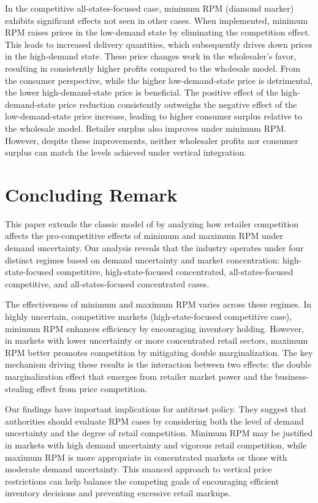 \documentclass[12pt]{article}
\begin{document}
In the competitive all-states-focused case, minimum RPM (diamond marker) exhibits significant effects not seen in other cases. When implemented, minimum RPM raises prices in the low-demand state by eliminating the competition effect. This leads to increased delivery quantities, which subsequently drives down prices in the high-demand state. These price changes work in the wholesaler's favor, resulting in consistently higher profits compared to the wholesale model. From the consumer perspective, while the higher low-demand-state price is detrimental, the lower high-demand-state price is beneficial. The positive effect of the high-demand-state price reduction consistently outweighs the negative effect of the low-demand-state price increase, leading to higher consumer surplus relative to the wholesale model. Retailer surplus also improves under minimum RPM. However, despite these improvements, neither wholesaler profits nor consumer surplus can match the levels achieved under vertical integration.

\section{Concluding Remark}


This paper extends the classic model of \cite{deneckereDemandUncertaintyPrice1997} by analyzing how retailer competition affects the pro-competitive effects of minimum and maximum RPM under demand uncertainty. Our analysis reveals that the industry operates under four distinct regimes based on demand uncertainty and market concentration: high-state-focused competitive, high-state-focused concentrated, all-states-focused competitive, and all-states-focused concentrated cases.

The effectiveness of minimum and maximum RPM varies across these regimes. In highly uncertain, competitive markets (high-state-focused competitive case), minimum RPM enhances efficiency by encouraging inventory holding. However, in markets with lower uncertainty or more concentrated retail sectors, maximum RPM better promotes competition by mitigating double marginalization. The key mechanism driving these results is the interaction between two effects: the double marginalization effect that emerges from retailer market power and the business-stealing effect from price competition.

Our findings have important implications for antitrust policy. They suggest that authorities should evaluate RPM cases by considering both the level of demand uncertainty and the degree of retail competition. Minimum RPM may be justified in markets with high demand uncertainty and vigorous retail competition, while maximum RPM is more appropriate in concentrated markets or those with moderate demand uncertainty. This nuanced approach to vertical price restrictions can help balance the competing goals of encouraging efficient inventory decisions and preventing excessive retail markups.

\singlespacing
\setlength\bibsep{0pt}


\end{document}
